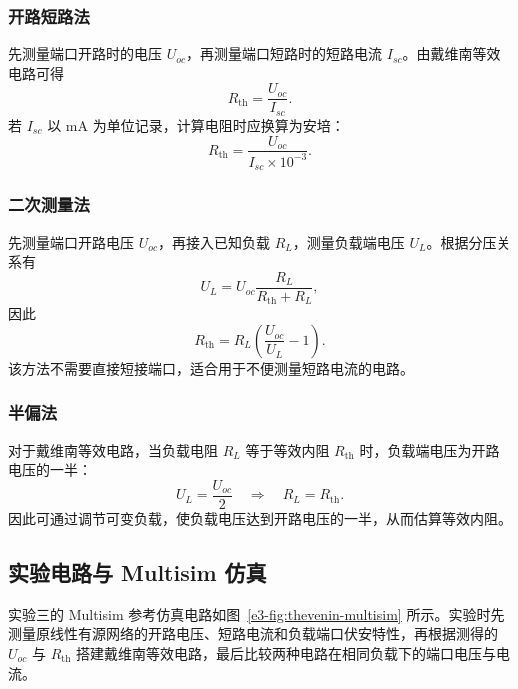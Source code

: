 \subsubsection{开路短路法}

先测量端口开路时的电压 \(U_{oc}\)，再测量端口短路时的短路电流 \(I_{sc}\)。由戴维南等效电路可得
\begin{equation}
    R_{\mathrm{th}}=\frac{U_{oc}}{I_{sc}}.
\end{equation}
若 \(I_{sc}\) 以 \(\mathrm{mA}\) 为单位记录，计算电阻时应换算为安培：
\begin{equation}
    R_{\mathrm{th}}=\frac{U_{oc}}{I_{sc}\times 10^{-3}}.
\end{equation}

\subsubsection{二次测量法}

先测量端口开路电压 \(U_{oc}\)，再接入已知负载 \(R_L\)，测量负载端电压 \(U_L\)。根据分压关系有
\begin{equation}
    U_L = U_{oc}\frac{R_L}{R_{\mathrm{th}}+R_L},
\end{equation}
因此
\begin{equation}
    R_{\mathrm{th}}=R_L\left(\frac{U_{oc}}{U_L}-1\right).
\end{equation}
该方法不需要直接短接端口，适合用于不便测量短路电流的电路。

\subsubsection{半偏法}

对于戴维南等效电路，当负载电阻 \(R_L\) 等于等效内阻 \(R_{\mathrm{th}}\) 时，负载端电压为开路电压的一半：
\begin{equation}
    U_L=\frac{U_{oc}}{2}\quad\Longrightarrow\quad R_L=R_{\mathrm{th}}.
\end{equation}
因此可通过调节可变负载，使负载电压达到开路电压的一半，从而估算等效内阻。

\subsection{实验电路与 Multisim 仿真}

实验三的 Multisim 参考仿真电路如图~\ref{e3-fig:thevenin-multisim} 所示。实验时先测量原线性有源网络的开路电压、短路电流和负载端口伏安特性，再根据测得的 \(U_{oc}\) 与 \(R_{\mathrm{th}}\) 搭建戴维南等效电路，最后比较两种电路在相同负载下的端口电压与电流。

